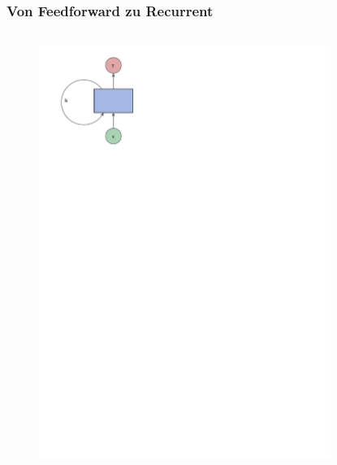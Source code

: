 \documentclass[german,aspectratio=169]{beamer}
\begin{document}
\begin{frame}
	\frametitle{Von Feedforward zu Recurrent}
\begin{columns}
	\begin{column}{0.3\textwidth}
	\begin{figure}
		\includegraphics[scale=0.7]{rnn-diagram.pdf}
	\end{figure}
	\end{column}
	\hfill
	\begin{column}{0.7\textwidth}
		\begin{figure}

\end{figure}
\end{column}
\end{columns}
\end{frame}
\end{document}
